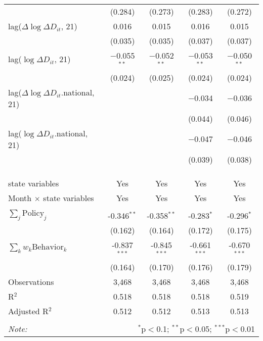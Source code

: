 \begin{tabular}{@{\extracolsep{1pt}}lcccc}
  & (0.284) & (0.273) & (0.283) & (0.272) \\ 
  lag($\Delta \log \Delta D_{it}$, 21) & 0.016 & 0.015 & 0.016 & 0.015 \\ 
  & (0.035) & (0.035) & (0.037) & (0.037) \\ 
  lag($\log \Delta D_{it}$, 21) & $-$0.055$^{**}$ & $-$0.052$^{**}$ & $-$0.053$^{**}$ & $-$0.050$^{**}$ \\ 
  & (0.024) & (0.025) & (0.024) & (0.024) \\ 
  lag($\Delta \log \Delta D_{it}$.national, 21) &  &  & $-$0.034 & $-$0.036 \\ 
  &  &  & (0.044) & (0.046) \\ 
  lag($\log \Delta D_{it}$.national, 21) &  &  & $-$0.047 & $-$0.046 \\ 
  &  &  & (0.039) & (0.038) \\ 
   &  &  &  &  \\ 
  &  &  &  &  \\ 
 \hline \\[-1.8ex] 
state variables & Yes & Yes & Yes & Yes \\ 
Month $\times$ state variables & Yes & Yes & Yes & Yes \\ 
\hline \\[-1.8ex] 
$\sum_j \mathrm{Policy}_j$ & -0.346$^{**}$ & -0.358$^{**}$ & -0.283$^{*}$ & -0.296$^{*}$ \\ 
 & (0.162) & (0.164) & (0.172) & (0.175) \\ 
$\sum_k w_k \mathrm{Behavior}_k$ & -0.837$^{***}$ & -0.845$^{***}$ & -0.661$^{***}$ & -0.670$^{***}$ \\ 
 & (0.164) & (0.170) & (0.176) & (0.179) \\ 
Observations & 3,468 & 3,468 & 3,468 & 3,468 \\ 
R$^{2}$ & 0.518 & 0.518 & 0.518 & 0.519 \\ 
Adjusted R$^{2}$ & 0.512 & 0.512 & 0.513 & 0.513 \\ 
\hline 
\hline \\[-1.8ex] 
\textit{Note:}  & \multicolumn{4}{r}{$^{*}$p$<$0.1; $^{**}$p$<$0.05; $^{***}$p$<$0.01} \\ 
\end{tabular} 